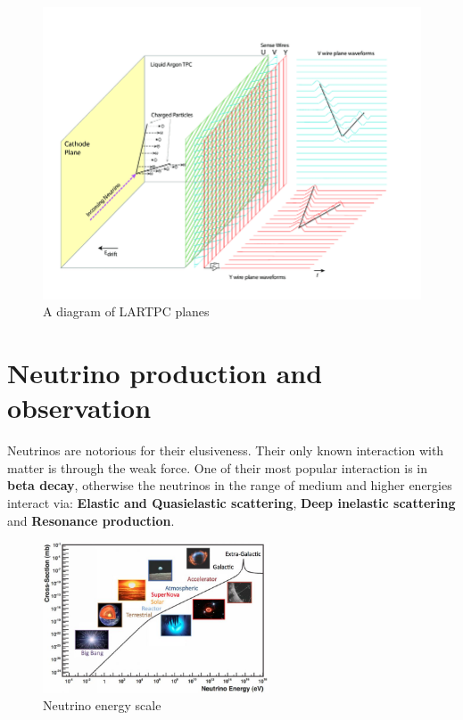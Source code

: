 \begin{figure}[H]
\centering
\includegraphics[width=1.\textwidth]{figures/chapter6/Operational-principle-of-the-MicroBooNE-LArTPC.png}
\caption{A diagram of LARTPC planes \cite{microboone}}
\label{fig:lartpc-grids}
\end{figure}

\section{Neutrino production and observation}

Neutrinos are notorious for their elusiveness. Their only known interaction with matter is through the weak force.
One of their most popular interaction is in \textbf{beta decay}, otherwise the neutrinos in the range of medium and higher energies interact via: \textbf{Elastic and Quasielastic scattering}, \textbf{Deep inelastic scattering} and \textbf{Resonance production}.

\begin{figure}[H]
\centering
\includegraphics[width=0.6\textwidth]{figures/chapter6/neutrino-energy-scale.jpg}
\caption{Neutrino energy scale \cite{RevModPhys.84.1307}}
\label{fig:neutrino-energy}
\end{figure}

